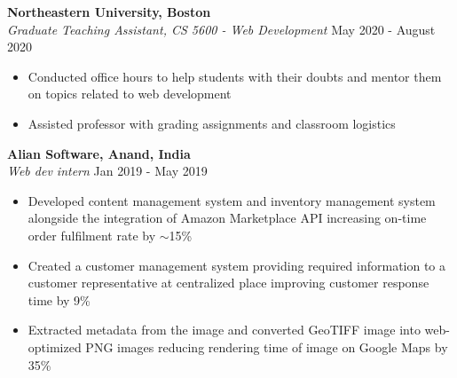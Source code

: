 \documentclass[]{article}
\begin{document}
\hspace{1mm}
\textbf{Northeastern University, Boston}\\
\hspace{1mm}
\textit{Graduate Teaching Assistant, CS 5600 - Web Development} \hfill May 2020 - August 2020\\
\vspace{-3mm}
\begin{itemize}
    \setlength\itemsep{-1mm}
    \item Conducted office hours to help students with their doubts and mentor them on topics related to web development
    \item Assisted professor with grading assignments and classroom logistics  
\end{itemize}
\vspace{-2mm}
\hspace{1mm}
\textbf{Alian Software, Anand, India}\\
\hspace{1mm}
\textit{Web dev intern} \hfill Jan 2019 - May 2019\\
\vspace{-3mm}
\begin{itemize}
    \setlength\itemsep{-1mm}
    \item Developed content management system and inventory management system alongside the integration of Amazon Marketplace API increasing on-time order fulfilment rate by $\sim$15\%
	\item Created a customer management system providing required information to a customer representative at centralized place improving customer response time by 9\%
	\item Extracted metadata from the image and converted GeoTIFF image into web-optimized PNG images reducing rendering time of image on Google Maps by 35\%
\end{itemize}

\end{document}
